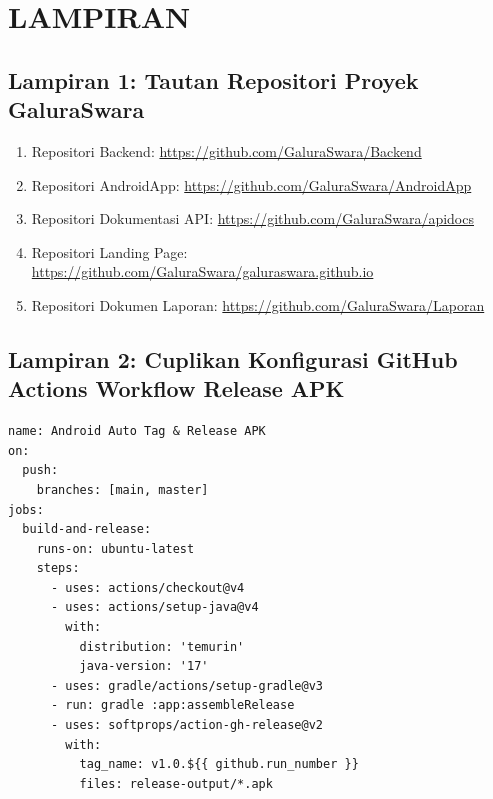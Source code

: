 \section*{LAMPIRAN}

\subsection*{Lampiran 1: Tautan Repositori Proyek GaluraSwara}
\begin{enumerate}
    \item Repositori Backend: \url{https://github.com/GaluraSwara/Backend}
    \item Repositori AndroidApp: \url{https://github.com/GaluraSwara/AndroidApp}
    \item Repositori Dokumentasi API: \url{https://github.com/GaluraSwara/apidocs}
    \item Repositori Landing Page: \url{https://github.com/GaluraSwara/galuraswara.github.io}
    \item Repositori Dokumen Laporan: \url{https://github.com/GaluraSwara/Laporan}
\end{enumerate}

\subsection*{Lampiran 2: Cuplikan Konfigurasi GitHub Actions Workflow Release APK}
\begin{verbatim}
name: Android Auto Tag & Release APK
on:
  push:
    branches: [main, master]
jobs:
  build-and-release:
    runs-on: ubuntu-latest
    steps:
      - uses: actions/checkout@v4
      - uses: actions/setup-java@v4
        with:
          distribution: 'temurin'
          java-version: '17'
      - uses: gradle/actions/setup-gradle@v3
      - run: gradle :app:assembleRelease
      - uses: softprops/action-gh-release@v2
        with:
          tag_name: v1.0.${{ github.run_number }}
          files: release-output/*.apk
\end{verbatim}
